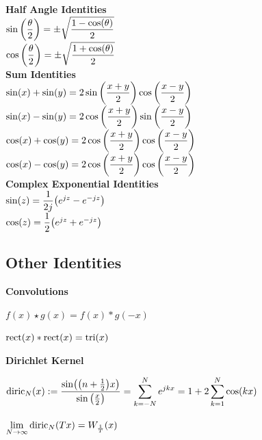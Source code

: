 \documentclass[11pt]{article}
\begin{document}
\begin{multicols}{2}
  \textbf{Half Angle Identities}\\
  \(\sin{\left( \dfrac{\theta}{2} \right)} = \pm \sqrt{\dfrac{1 - \cos(\theta)}{2}}\) \vspace{6pt}\\
  \(\cos{\left( \dfrac{\theta}{2} \right)} = \pm \sqrt{\dfrac{1 + \cos(\theta)}{2}}\) \vspace{6pt}\\

  \textbf{Sum Identities}\\
  \(\sin(x) + \sin(y) = 2\sin{\left( \dfrac{x + y}{2} \right)}\cos{\left( \dfrac{x - y}{2} \right)}\) \vspace{10pt}\\
  \(\sin(x) - \sin(y) = 2\cos{\left( \dfrac{x + y}{2} \right)}\sin{\left( \dfrac{x - y}{2} \right)}\) \vspace{10pt}\\
  \(\cos(x) + \cos(y) = 2\cos{\left( \dfrac{x + y}{2} \right)}\cos{\left( \dfrac{x - y}{2} \right)}\) \vspace{10pt}\\
  \(\cos(x) - \cos(y) = 2\cos{\left( \dfrac{x + y}{2} \right)}\cos{\left( \dfrac{x - y}{2} \right)}\) \vspace{10pt}\\
  \textbf{Complex Exponential Identities}\\
  \(\sin(z) = \dfrac{1}{2j}{\left( e^{jz} - e ^{-jz} \right)}\)\vspace{6pt}\\
  \(\cos(z) = \dfrac{1}{2}{\left( e^{jz} + e ^{-jz} \right)}\)
  \end{multicols}

  \pagebreak

  \subsection{Other Identities}


  \textbf{Convolutions}

  \(f(x) \star g(x) = f(x) * g(-x)\)

  \(\mathrm{rect}(x) * \mathrm{rect}(x) = \mathrm{tri}(x)\)

  \vspace{12pt}

  \textbf{Dirichlet Kernel}

  \(\displaystyle
  \mathrm{diric}_N(x) := \dfrac{\sin({\left( n + \frac{1}{2} \right)}x)}{\sin{\left( \frac{x}{2} \right)}} =
  \sum_{k = -N}^{N} e^{jkx} =
  1 + 2\sum_{k = 1}^N\cos(kx)\)

  \(\displaystyle \lim_{N \to \infty} \mathrm{diric}_{N}(Tx) = W_{\frac{1}{T}}(x)\)
\end{document}
